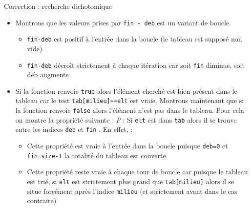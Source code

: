 \documentclass[10pt]{beamer}
\begin{document}
\begin{frame}[fragile]{\Ctitle}{\stitle}
	\begin{exampleblock}{Correction : recherche dichotomique}
		\begin{itemize}
			\item<2->\textcolor{OliveGreen}{Montrons que les valeurs prises par {\tt fin - deb} est un variant de boucle.
				\begin{itemize}
					\item\textcolor{OliveGreen}{{\tt fin-deb} est positif à l'entrée dans la boucle (le tableau est supposé non vide)}
					\item\textcolor{OliveGreen}{{\tt fin-deb} décroît strictement à chaque itération car soit {\tt fin} diminue, soit {\tt }deb augmente}
				\end{itemize}
			}
			\item<3->\textcolor{OliveGreen}{Si la fonction renvoie {\tt true} alors l'élément cherché est bien présent dans le tableau car le test {\tt tab[milieu]==elt} est vraie. Montrons maintenant que si la fonction renvoie {\tt false} alors l'élément n'est pas dans le tableau. Pour cela on montre la propriété suivante : $P$ : \og{} Si {\tt elt} est dans {\tt tab} alors il se trouve entre les indices {\tt deb} et {\tt fin} \fg{}. En effet, :
				\begin{itemize}
					\item<4->\textcolor{OliveGreen}{Cette propriété est vraie à l'entrée dans la boucle puisque {\tt deb=0} et {\tt fin=size-1} la totalité du tableau est couverte.}
					\item<5->\textcolor{OliveGreen}{Cette propriété reste vraie à chaque tour de boucle car puisque le tableau est trié, si {\tt elt} est strictement plus grand que {\tt tab[milieu]} alors il se situe forcément après l'indice {\tt milieu} (et strictement avant dans le cas contraire)}
				\end{itemize}}
		\end{itemize}
	\end{exampleblock}
\end{frame}
\end{document}
